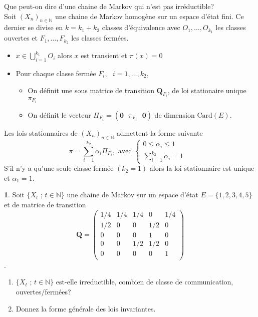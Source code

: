 \documentclass[8pt,notheorems]{beamer}
\def \N{\mathbb N}
\theoremstyle{definition}
\theoremstyle{example}
\newtheorem{example}{\translate{Exemple}}
\theoremstyle{mystyle}
\theoremstyle{plain}
\begin{document}
\begin{frame}[allowframebreaks]
Que peut-on dire d'une chaine de Markov qui n'est pas irréductible?\\
Soit $(X_{n})_{n\in\N}$ une chaine de Markov homogène sur un espace d'état fini. Ce dernier se divise en $k=k_1+k_2$ classes d'équivalence avec $O_1,\ldots,O_{k_1}$ les classes ouvertes et $F_1,\ldots,F_{k_2}$ les classes fermées.
\begin{itemize}
\item $x\in\bigcup_{i=1}^{k_1}O_i$ alors $x$ est transient et $\pi(x)=0$
\item Pour chaque classe fermée $F_i,\text{ }i=1,\ldots,k_2$,
\begin{itemize}
\item On définit une sous matrice de transition $\mathbf{Q}_{F_i}$, de loi stationaire unique $\pi_{F_i}$
\item On définit le vecteur $\Pi_{F_i}=\left(\mathbf{0}\text{ }\pi_{F_i}\text{ }\mathbf{0}\right)$ de dimension $\text{Card}(E)$.
\end{itemize}
\end{itemize}
Les lois stationnaires de $(X_{n})_{n\in\N}$ admettent la forme suivante
$$
\pi=\sum_{i=1}^{k_2}\alpha_i \Pi_{F_i},\text{ avec }
\begin{cases}
0\leq \alpha_i\leq 1&\\
\sum_{i=1}^{k_2}\alpha_i=1&
\end{cases}
$$
S'il n'y a qu'une seule classe fermée $(k_2=1)$ alors la loi stationnaire est unique et $\alpha_1=1$.
\begin{example}
Soit $\{X_t\text{ ; }t\in\mathbb{N}\}$ une chaine de Markov sur un espace d'état $E=\{1,2,3,4,5\}$ et de matrice de transition
$$\mathbf{Q}=\left(\begin{array}{ccccc}
1/4&1/4&1/4&0&1/4\\
1/2&0&0&1/2&0\\
0&0&0&1&0\\
0&0&1/2&1/2&0\\
0&0&0&0&1\\
\end{array}\right)$$.
\begin{enumerate}
\item $\{X_t\text{ ; }t\in\mathbb{N}\}$ est-elle irreductible, combien de classe de communication, ouvertes/fermées?
\item Donnez la forme générale des lois invariantes.

\end{enumerate}
\end{example}
\end{frame}
\end{document}
